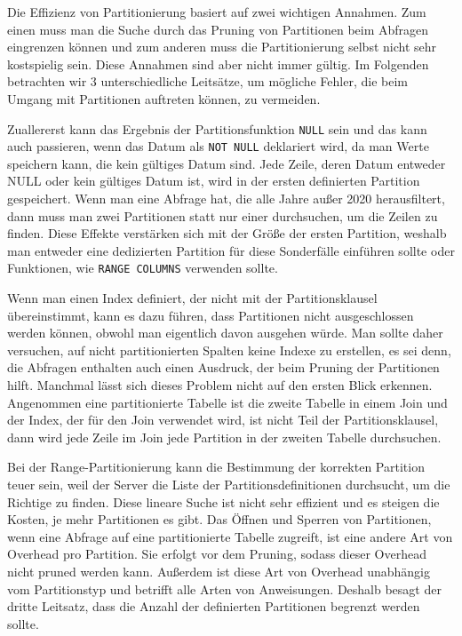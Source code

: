 Die Effizienz von Partitionierung basiert auf zwei wichtigen Annahmen.
Zum einen muss man die Suche durch das Pruning von Partitionen beim Abfragen eingrenzen können und zum anderen muss die Partitionierung selbst nicht sehr kostspielig sein.
Diese Annahmen sind aber nicht immer gültig.
Im Folgenden betrachten wir 3 unterschiedliche Leitsätze, um mögliche Fehler, die beim Umgang mit Partitionen auftreten können, zu vermeiden.

Zuallererst kann das Ergebnis der Partitionsfunktion \texttt{NULL} sein und das kann auch passieren, wenn das Datum als \texttt{NOT NULL} deklariert wird, da man Werte speichern kann, die kein gültiges Datum sind.
Jede Zeile, deren Datum entweder NULL oder kein gültiges Datum ist, wird in der ersten definierten Partition gespeichert.
Wenn man eine Abfrage hat, die alle Jahre außer 2020 herausfiltert, dann muss man zwei Partitionen statt nur einer durchsuchen, um die Zeilen zu finden.
Diese Effekte verstärken sich mit der Größe der ersten Partition, weshalb man entweder eine dedizierten Partition für diese Sonderfälle einführen sollte oder Funktionen, wie \texttt{RANGE COLUMNS} verwenden sollte.

Wenn man einen Index definiert, der nicht mit der Partitionsklausel übereinstimmt, kann es dazu führen, dass Partitionen nicht ausgeschlossen werden können, obwohl man eigentlich davon ausgehen würde.
Man sollte daher versuchen, auf nicht partitionierten Spalten keine Indexe zu erstellen, es sei denn, die Abfragen enthalten auch einen Ausdruck, der beim Pruning der Partitionen hilft.
Manchmal lässt sich dieses Problem nicht auf den ersten Blick erkennen.
Angenommen eine partitionierte Tabelle ist die zweite Tabelle in einem Join und der Index, der für den Join verwendet wird, ist nicht Teil der Partitionsklausel, dann wird jede Zeile im Join jede Partition in der zweiten Tabelle durchsuchen.

Bei der Range-Partitionierung kann die Bestimmung der korrekten Partition teuer sein, weil der Server die Liste der Partitionsdefinitionen durchsucht, um die Richtige zu finden.
Diese lineare Suche ist nicht sehr effizient und es steigen die Kosten, je mehr Partitionen es gibt.
Das Öffnen und Sperren von Partitionen, wenn eine Abfrage auf eine partitionierte Tabelle zugreift, ist eine andere Art von Overhead pro Partition.
Sie erfolgt vor dem Pruning, sodass dieser Overhead nicht pruned werden kann.
Außerdem ist diese Art von Overhead unabhängig vom Partitionstyp und betrifft alle Arten von Anweisungen.
Deshalb besagt der dritte Leitsatz, dass die Anzahl der definierten Partitionen begrenzt werden sollte.

